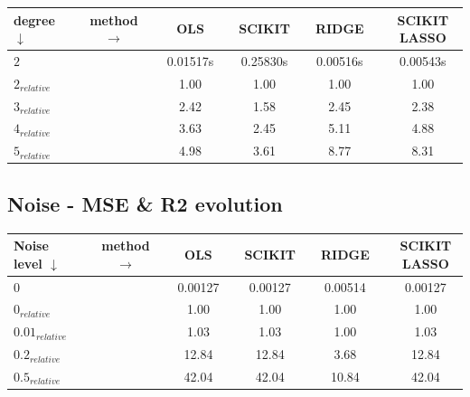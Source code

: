 \begin{center}
\label{tab:time-test}
\begin{tabularx}{\textwidth}{l X c X c X c X c X c}
    \hline
    \hline
        degree $\downarrow$ && method $\rightarrow$ && OLS && SCIKIT && RIDGE && SCIKIT LASSO\\
    \hline
        $2  $               && &&   0.01517s &&	0.25830s	 &&	0.00516s      && 0.00543s		\\
        $2_{relative}$   	&& &&   1.00   	 &&	1.00 	     &&	1.00          &&	1.00	\\
        $3_{relative}$   	&& &&   2.42   	 &&	1.58	     &&	2.45          &&	2.38	\\
        $4_{relative}$   	&& &&   3.63   	 &&	2.45	     &&	5.11          &&	4.88	\\
        $5_{relative}$   	&& &&   4.98   	 &&	3.61	     &&	8.77          &&	8.31	\\
    \hline
\end{tabularx}
\end{center}

\subsection{Noise - MSE \& R2 evolution}

\begin{center}
\label{tab:noise-test-MSE}
\begin{tabularx}{\textwidth}{l X c X c X c X c X c}
    \hline
    \hline
        Noise level $\downarrow$ && method $\rightarrow$ && OLS && SCIKIT && RIDGE && SCIKIT LASSO\\
    \hline
        $0  $               && &&   0.00127     &&	0.00127	  &&	0.00514      && 0.00127		\\
        $0_{relative}$   	&& &&   1.00   	    &&	1.00 	  &&	1.00         &&	1.00	\\
        $0.01_{relative}$   && &&   1.03   	    &&	1.03	  &&	1.00         &&	1.03	\\
        $0.2_{relative}$   	&& &&   12.84   	&&	12.84	  &&	3.68         &&	12.84	\\
        $0.5_{relative}$   	&& &&   42.04   	&&	42.04	  &&	10.84        &&	42.04	\\
    \hline
\end{tabularx}
\end{center}

